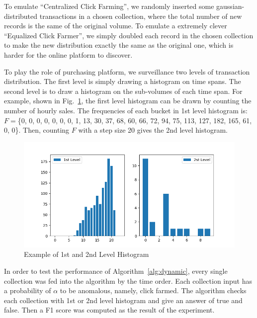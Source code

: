 \documentclass[a4paper]{IEEEtran}
\begin{document}
			To emulate ``Centralized Click Farming'', we randomly inserted some gaussian-distributed transactions in a chosen collection, where the total number of new records is the same of the original volume. To emulate a extremely clever ``Equalized Click Farmer'', we simply doubled each record in the chosen collection to make the new distribution exactly the same as the original one, which is harder for the online platform to discover.
			
			To play the role of purchasing platform, we surveillance two levels of transaction distribution. The first level is simply drawing a histogram on time spans. The second level is to draw a histogram on the sub-volumes of each time span. For example, shown in Fig.~\ref{fig:histogram-example}, the first level histogram can be drawn by counting the number of hourly sales. The frequencies of each bucket in 1st level histogram is: $F=$\{0, 0, 0, 0, 0, 0, 0, 1, 13, 30, 37, 68, 60, 66, 72, 94, 75, 113, 127, 182, 165, 61, 0, 0\}. Then, counting $F$ with a step size 20 gives the 2nd level histogram.
			
			\begin{figure}[!ht]
				\centering
				\includegraphics[width=\linewidth]{fig/HistogramExample.png}
				\caption{Example of 1st and 2nd Level Histogram}
				\label{fig:histogram-example}
			\end{figure}
			
			In order to test the performance of Algorithm~\ref{alg:dynamic}, every single collection was fed into the algorithm by the time order. Each collection input has a probability of $\alpha$ to be anomalous, namely, click farmed. The algorithm checks each collection with 1st or 2nd level histogram and give an answer of true and false. Then a F1 score was computed as the result of the experiment.
			
\end{document}
